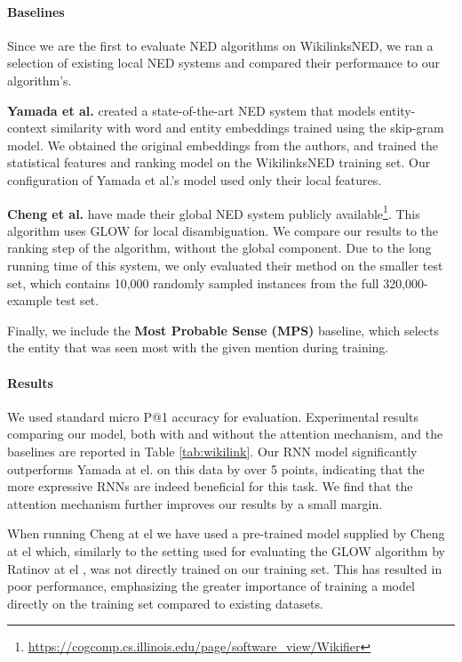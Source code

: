 \documentclass[11pt]{article}
\begin{document}
	\paragraph{Baselines}
	Since we are the first to evaluate NED algorithms on WikilinksNED, we ran a selection of existing local NED systems and compared their performance to our algorithm's. 
	
	\textbf{Yamada et al.}  created a state-of-the-art NED system that models entity-context similarity with word and entity embeddings trained using the skip-gram model. We obtained the original embeddings from the authors, and trained the statistical features and ranking model on the WikilinksNED training set. Our configuration of Yamada et al.'s model used only their local features.
	
	\textbf{Cheng et al.}  have made their global NED system publicly available\footnote{\url{https://cogcomp.cs.illinois.edu/page/software\_view/Wikifier}}. This algorithm uses GLOW \cite{Ratinov2011} for local disambiguation. We compare our results to the ranking step of the algorithm, without the global component. Due to the long running time of this system, we only evaluated their method on the smaller test set, which contains 10,000 randomly sampled instances from the full 320,000-example test set.
	
	Finally, we include the \textbf{Most Probable Sense (MPS)} baseline, which selects the entity that was seen most with the given mention during training.
	
	\paragraph{Results}
	We used standard micro P@1 accuracy for evaluation. Experimental results comparing our model, both with and without the attention mechanism, and the baselines are reported in Table \ref{tab:wikilink}. Our RNN model significantly outperforms Yamada at el. on this data by over 5 points, indicating that the more expressive RNNs are indeed beneficial for this task. We find that the attention mechanism further improves our results by a small margin.
	
	When running Cheng at el  we have used a pre-trained model supplied by Cheng at el which, similarly to the setting used for evaluating the GLOW algorithm by Ratinov at el \cite{ratinov2011glow}, was not directly trained on our training set. This has resulted in poor performance, emphasizing the greater importance of training a model directly on the training set compared to existing datasets.
	
\end{document}

